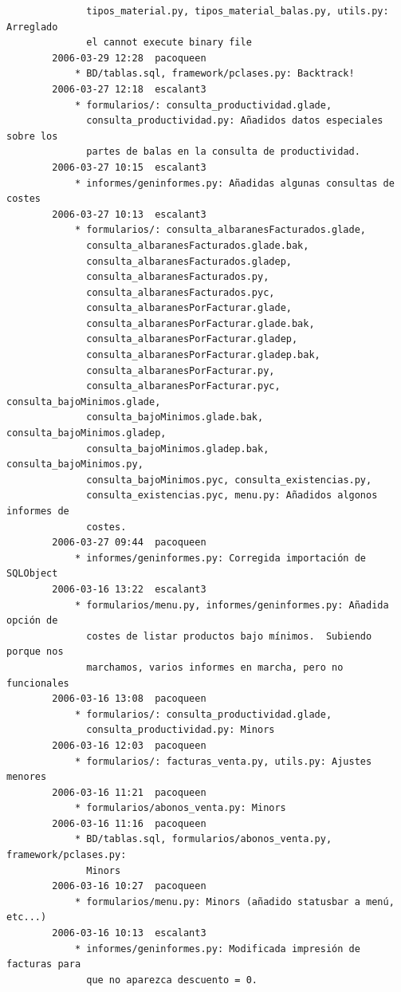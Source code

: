 \documentclass[a4paper]{article}
\begin{document}
\begin{verbatim}
              tipos_material.py, tipos_material_balas.py, utils.py: Arreglado
              el cannot execute binary file
        2006-03-29 12:28  pacoqueen
            * BD/tablas.sql, framework/pclases.py: Backtrack!
        2006-03-27 12:18  escalant3
            * formularios/: consulta_productividad.glade,
              consulta_productividad.py: Añadidos datos especiales sobre los
              partes de balas en la consulta de productividad.
        2006-03-27 10:15  escalant3
            * informes/geninformes.py: Añadidas algunas consultas de costes
        2006-03-27 10:13  escalant3
            * formularios/: consulta_albaranesFacturados.glade,
              consulta_albaranesFacturados.glade.bak,
              consulta_albaranesFacturados.gladep,
              consulta_albaranesFacturados.py,
              consulta_albaranesFacturados.pyc,
              consulta_albaranesPorFacturar.glade,
              consulta_albaranesPorFacturar.glade.bak,
              consulta_albaranesPorFacturar.gladep,
              consulta_albaranesPorFacturar.gladep.bak,
              consulta_albaranesPorFacturar.py,
              consulta_albaranesPorFacturar.pyc, consulta_bajoMinimos.glade,
              consulta_bajoMinimos.glade.bak, consulta_bajoMinimos.gladep,
              consulta_bajoMinimos.gladep.bak, consulta_bajoMinimos.py,
              consulta_bajoMinimos.pyc, consulta_existencias.py,
              consulta_existencias.pyc, menu.py: Añadidos algonos informes de
              costes.
        2006-03-27 09:44  pacoqueen
            * informes/geninformes.py: Corregida importación de SQLObject
        2006-03-16 13:22  escalant3
            * formularios/menu.py, informes/geninformes.py: Añadida opción de
              costes de listar productos bajo mínimos.  Subiendo porque nos
              marchamos, varios informes en marcha, pero no funcionales
        2006-03-16 13:08  pacoqueen
            * formularios/: consulta_productividad.glade,
              consulta_productividad.py: Minors
        2006-03-16 12:03  pacoqueen
            * formularios/: facturas_venta.py, utils.py: Ajustes menores
        2006-03-16 11:21  pacoqueen
            * formularios/abonos_venta.py: Minors
        2006-03-16 11:16  pacoqueen
            * BD/tablas.sql, formularios/abonos_venta.py, framework/pclases.py:
              Minors
        2006-03-16 10:27  pacoqueen
            * formularios/menu.py: Minors (añadido statusbar a menú, etc...)
        2006-03-16 10:13  escalant3
            * informes/geninformes.py: Modificada impresión de facturas para
              que no aparezca descuento = 0.

\end{verbatim}
\end{document}
